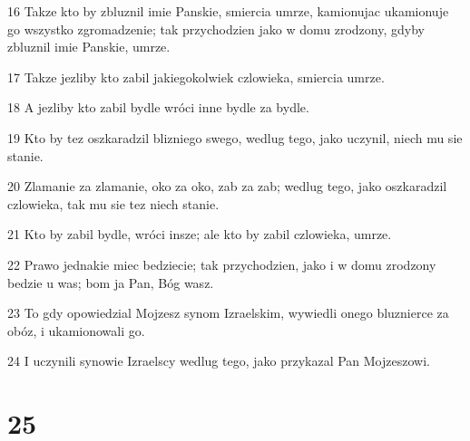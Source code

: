 \par 16 Takze kto by zbluznil imie Panskie, smiercia umrze, kamionujac ukamionuje go wszystko zgromadzenie; tak przychodzien jako w domu zrodzony, gdyby zbluznil imie Panskie, umrze.
\par 17 Takze jezliby kto zabil jakiegokolwiek czlowieka, smiercia umrze.
\par 18 A jezliby kto zabil bydle wróci inne bydle za bydle.
\par 19 Kto by tez oszkaradzil blizniego swego, wedlug tego, jako uczynil, niech mu sie stanie.
\par 20 Zlamanie za zlamanie, oko za oko, zab za zab; wedlug tego, jako oszkaradzil czlowieka, tak mu sie tez niech stanie.
\par 21 Kto by zabil bydle, wróci insze; ale kto by zabil czlowieka, umrze.
\par 22 Prawo jednakie miec bedziecie; tak przychodzien, jako i w domu zrodzony bedzie u was; bom ja Pan, Bóg wasz.
\par 23 To gdy opowiedzial Mojzesz synom Izraelskim, wywiedli onego bluznierce za obóz, i ukamionowali go.
\par 24 I uczynili synowie Izraelscy wedlug tego, jako przykazal Pan Mojzeszowi.

\chapter{25}


